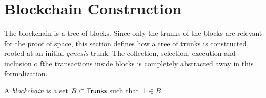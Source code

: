 \section{Blockchain Construction}\label{sec:blockchain_construction}

The blockchain is a tree of blocks. Since only the trunks of the blocks are
relevant for the proof of space, this section defines how a tree of trunks
is constructed, rooted at an initial \emph{genesis} trunk. The collection,
selection, execution and inclusion o fthe transactions inside blocks is
completely abstracted away in this formalization.

\begin{definition}\label{def:blockchain}
  A \emph{blockchain} is a set $B\subset{\mathsf{Trunks}}$ such that $\bot\in B$.
\end{definition}
